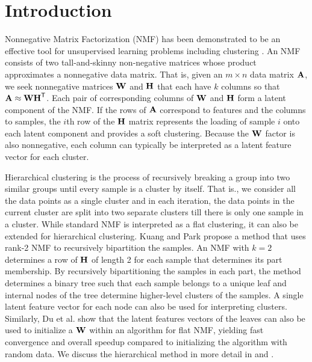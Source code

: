
\section{Introduction}

Nonnegative Matrix Factorization (NMF) has been demonstrated to be an effective tool for unsupervised learning problems including clustering \cite{XLG03, SBPP06, DHS05}. 
An NMF consists of two tall-and-skinny non-negative matrices whose product approximates a nonnegative data matrix.
That is, given an $m\times n$ data matrix $\M{A}$, we seek nonnegative matrices $\M{W}$ and $\M{H}$ that each have $k$ columns so that $\M{A} \approx \M{W}\M{H}^\Tra$.
Each pair of corresponding columns of $\M{W}$ and $\M{H}$ form a latent component of the NMF.
If the rows of $\M{A}$ correspond to features and the columns to samples, the $i$th row of the $\M{H}$ matrix represents the loading of sample $i$ onto each latent component and provides a soft clustering.
Because the $\M{W}$ factor is also nonnegative, each column can typically be interpreted as a latent feature vector for each cluster.

Hierarchical clustering is the process of recursively breaking a group into two similar groups until every sample is a cluster by itself. That is., we consider all the data points as a single cluster and in each iteration, the data points in the current cluster are split into two separate clusters till there is only one sample in a cluster.
While standard NMF is interpreted as a flat clustering, it can also be extended for hierarchical clustering.
Kuang and Park \cite{KP13} propose a method that uses rank-2 NMF to recursively bipartition the samples.
An NMF with $k=2$ determines a row of $\M{H}$ of length 2 for each sample that determines its part membership.
By recursively bipartitioning the samples in each part, the method determines a binary tree such that each sample belongs to a unique leaf and internal nodes of the tree determine higher-level clusters of the samples.
A single latent feature vector for each node can also be used for interpreting clusters.
Similarly, Du et al. \cite{DKDP17} show that the latent features vectors of the leaves can also be used to initialize a $\M{W}$ within an algorithm for flat NMF, yielding fast convergence and overall speedup compared to initializing the algorithm with random data.
We discuss the hierarchical method in more detail in  and .

